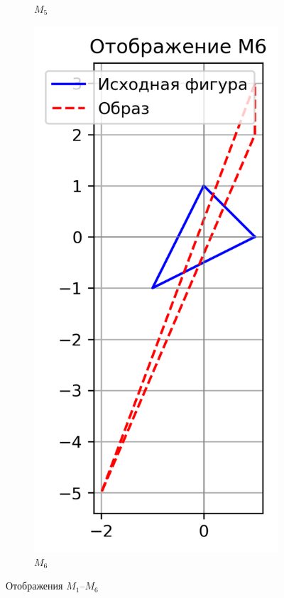 \begin{figure}[H]
\begin{subfigure}[b]{0.3\textwidth}
    \caption{$M_5$}
  \end{subfigure}\hfill
  \begin{subfigure}[b]{0.3\textwidth}
    \includegraphics[width=\linewidth]{plots/M6.png}
    \caption{$M_6$}
  \end{subfigure}
  \caption{Отображения $M_1$–$M_6$}
\end{figure}

